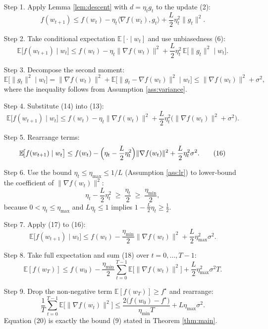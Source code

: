 \documentclass{article}
\begin{document}
\begin{enumerate}
\item[Step 1.] Apply Lemma \ref{lem:descent} with $d=\eta_t g_t$ to the update (2):
\[
f(w_{t+1})\le f(w_t)-\eta_t\langle\nabla f(w_t),g_t\rangle+\frac{L}{2}\eta_t^2\|g_t\|^2.
\tag{12}
\]

\item[Step 2.] Take conditional expectation $\mathbb{E}[\cdot\mid w_t]$ and use unbiasedness (6):
\[
\mathbb{E}\!\bigl[f(w_{t+1})\mid w_t\bigr]\le
f(w_t)-\eta_t\|\nabla f(w_t)\|^2
+\frac{L}{2}\eta_t^2\,
\mathbb{E}\!\bigl[\|g_t\|^2\mid w_t\bigr].
\tag{13}
\]

\item[Step 3.] Decompose the second moment:
\[
\mathbb{E}\!\bigl[\|g_t\|^2\mid w_t\bigr]
= \|\nabla f(w_t)\|^2
+ \mathbb{E}\!\bigl[\|g_t-\nabla f(w_t)\|^2\mid w_t\bigr]
\le \|\nabla f(w_t)\|^2+\sigma^2,
\tag{14}
\]
where the inequality follows from Assumption \ref{ass:variance}.

\item[Step 4.] Substitute (14) into (13):
\[
\mathbb{E}\!\bigl[f(w_{t+1})\mid w_t\bigr]\le
f(w_t)-\eta_t\|\nabla f(w_t)\|^2
+\frac{L}{2}\eta_t^2\bigl(\|\nabla f(w_t)\|^2+\sigma^2\bigr).
\tag{15}
\]

\item[Step 5.] Rearrange terms:
\[
\mathbb{E}\!\bigl[f(w_{t+1})\mid w_t\bigr]\le
f(w_t)-\Bigl(\eta_t-\frac{L}{2}\eta_t^2\Bigr)\|\nabla f(w_t)\|^2
+\frac{L}{2}\eta_t^2\sigma^2 .
\tag{16}
\]

\item[Step 6.] Use the bound $\eta_t\le\eta_{\max}\le 1/L$ (Assumption \ref{ass:lr}) to lower‑bound the coefficient of $\|\nabla f(w_t)\|^2$:
\[
\eta_t-\frac{L}{2}\eta_t^2
\;\ge\; \frac{\eta_t}{2}
\;\ge\; \frac{\eta_{\min}}{2},
\tag{17}
\]
because $0<\eta_t\le\eta_{\max}$ and $L\eta_t\le1$ implies $1-\frac{L}{2}\eta_t\ge\frac12$.

\item[Step 7.] Apply (17) to (16):
\[
\mathbb{E}\!\bigl[f(w_{t+1})\mid w_t\bigr]\le
f(w_t)-\frac{\eta_{\min}}{2}\|\nabla f(w_t)\|^2
+\frac{L}{2}\eta_{\max}^2\sigma^2 .
\tag{18}
\]

\item[Step 8.] Take full expectation and sum (18) over $t=0,\dots,T-1$:
\[
\mathbb{E}[f(w_T)]\le f(w_0)-\frac{\eta_{\min}}{2}
\sum_{t=0}^{T-1}\mathbb{E}\bigl[\|\nabla f(w_t)\|^2\bigr]
+\frac{L}{2}\eta_{\max}^2\sigma^2 T .
\tag{19}
\]

\item[Step 9.] Drop the non‑negative term $\mathbb{E}[f(w_T)]\ge f^\star$ and rearrange:
\[
\frac1T\sum_{t=0}^{T-1}\mathbb{E}\bigl[\|\nabla f(w_t)\|^2\bigr]
\le
\frac{2\bigl(f(w_0)-f^\star\bigr)}{\eta_{\min}T}
+L\eta_{\max}\sigma^2 .
\tag{20}
\]
Equation (20) is exactly the bound (9) stated in Theorem \ref{thm:main}. \qedhere
\end{enumerate}
\end{document}
